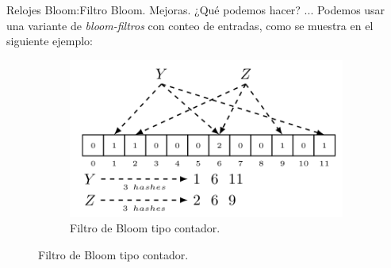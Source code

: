 \begin{frame}[fragile]{Relojes Bloom:}{Filtro Bloom. Mejoras.}
  \justifying
  ¿Qué podemos hacer? ...\newline
  Podemos usar una variante de \textit{bloom-filtros} con conteo
  de entradas, como se muestra en el siguiente ejemplo:
    \begin{figure}
    \centering
    \begin{subfigure}[b]{0.5\textwidth}
      \includegraphics[width=\textwidth]{./Imagenes/CountingBloomClock}
      \caption{Filtro de Bloom tipo contador.}
      \label{fig:Ejemplo de un CountingBloomClock.}
    \end{subfigure}
  \end{figure}
\end{frame}
